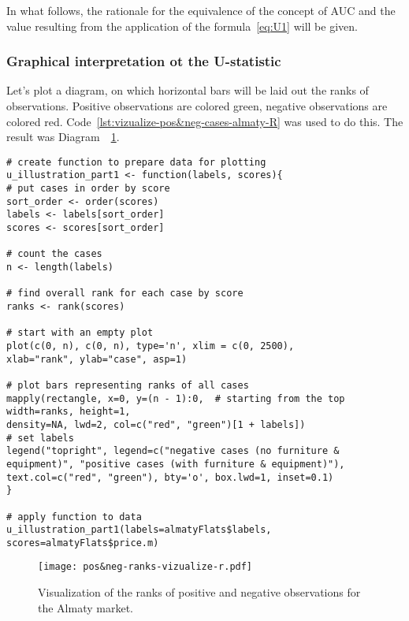 \documentclass[]{scrreprt}
\begin{document}
In what follows, the rationale for the equivalence of the concept of AUC and the value resulting from the application of the formula~\ref{eq:U1} will be given.
%
\subsubsection{Graphical interpretation ot the U-statistic}
Let's plot a diagram, on which horizontal bars will be laid out the ranks of observations. Positive observations are colored green, negative observations are colored red. Code~\ref{lst:vizualize-pos&neg-cases-almaty-R} was used to do this. The result was Diagram~~\ref{fig:pos&neg-ranks-vizualize-r.pdf}.
%
\begin{lstlisting}[float=htp, caption = Visualization of the ranks of positive and negative observations for the Almaty market, firstnumber=1, label= lst:vizualize-pos&neg-cases-almaty-R]
# create function to prepare data for plotting
u_illustration_part1 <- function(labels, scores){
# put cases in order by score
sort_order <- order(scores)
labels <- labels[sort_order]
scores <- scores[sort_order]

# count the cases
n <- length(labels)

# find overall rank for each case by score
ranks <- rank(scores)

# start with an empty plot
plot(c(0, n), c(0, n), type='n', xlim = c(0, 2500),
xlab="rank", ylab="case", asp=1)

# plot bars representing ranks of all cases
mapply(rectangle, x=0, y=(n - 1):0,  # starting from the top 
width=ranks, height=1, 
density=NA, lwd=2, col=c("red", "green")[1 + labels])
# set labels   
legend("topright", legend=c("negative cases (no furniture & equipment)", "positive cases (with furniture & equipment)"), 
text.col=c("red", "green"), bty='o', box.lwd=1, inset=0.1)
}

# apply function to data
u_illustration_part1(labels=almatyFlats$labels, scores=almatyFlats$price.m)
\end{lstlisting}
%
\begin{figure}[htp]
	\centering
	\texttt{[image: pos\&neg-ranks-vizualize-r.pdf]}
	\caption{Visualization of the ranks of positive and negative observations for the Almaty market.}
	\label{fig:pos&neg-ranks-vizualize-r.pdf}
\end{figure}
%
\end{document}
